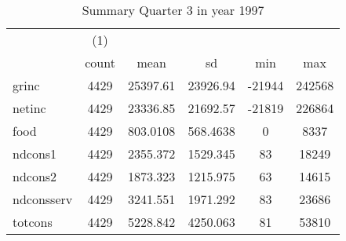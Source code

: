 \begin{table}[htbp]\centering
\def\sym#1{\ifmmode^{#1}\else\(^{#1}\)\fi}
\caption{Summary Quarter 3 in year 1997 \label{sum\_Q3\_y1997}}
\begin{tabular}{l*{1}{ccccc}}
\hline\hline
            &\multicolumn{1}{c}{(1)}&            &            &            &            \\
            &       count&        mean&          sd&         min&         max\\
\hline
grinc       &        4429&    25397.61&    23926.94&      -21944&      242568\\
netinc      &        4429&    23336.85&    21692.57&      -21819&      226864\\
food        &        4429&    803.0108&    568.4638&           0&        8337\\
ndcons1     &        4429&    2355.372&    1529.345&          83&       18249\\
ndcons2     &        4429&    1873.323&    1215.975&          63&       14615\\
ndconsserv  &        4429&    3241.551&    1971.292&          83&       23686\\
totcons     &        4429&    5228.842&    4250.063&          81&       53810\\
\hline\hline
\end{tabular}
\end{table}
